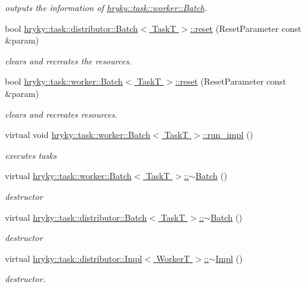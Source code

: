 \begin{DoxyCompactItemize}
\begin{DoxyCompactList}\small\item\em outputs the information of \hyperlink{classhryky_1_1task_1_1worker_1_1_batch}{hryky\-::task\-::worker\-::\-Batch}. \end{DoxyCompactList}\item 
bool \hyperlink{group__task_ga9ebf9038e6e40f583b3b26866e1f8131}{hryky\-::task\-::distributor\-::\-Batch$<$ Task\-T $>$\-::reset} (Reset\-Parameter const \&param)
\begin{DoxyCompactList}\small\item\em clears and recreates the resources. \end{DoxyCompactList}\item 
bool \hyperlink{group__task_ga88b1f6b27be23acb9fd42203d7cd3933}{hryky\-::task\-::worker\-::\-Batch$<$ Task\-T $>$\-::reset} (Reset\-Parameter const \&param)
\begin{DoxyCompactList}\small\item\em clears and recreates resources. \end{DoxyCompactList}\item 
virtual void \hyperlink{group__task_ga1f7366c2252fb0c7a7c8dc6f92a31e88}{hryky\-::task\-::worker\-::\-Batch$<$ Task\-T $>$\-::run\-\_\-impl} ()
\begin{DoxyCompactList}\small\item\em executes tasks \end{DoxyCompactList}\item 
virtual \hyperlink{group__task_ga11956032bccdfa3a83ec3615f9c03d0f}{hryky\-::task\-::worker\-::\-Batch$<$ Task\-T $>$\-::$\sim$\-Batch} ()
\begin{DoxyCompactList}\small\item\em destructor \end{DoxyCompactList}\item 
virtual \hyperlink{group__task_ga80bd5c0c04972878c21bd5eda4c7d4e7}{hryky\-::task\-::distributor\-::\-Batch$<$ Task\-T $>$\-::$\sim$\-Batch} ()
\begin{DoxyCompactList}\small\item\em destructor \end{DoxyCompactList}\item 
\hypertarget{group__task_gae688f82c064cc006f0eba491339faca1}{virtual \hyperlink{group__task_gae688f82c064cc006f0eba491339faca1}{hryky\-::task\-::distributor\-::\-Impl$<$ Worker\-T $>$\-::$\sim$\-Impl} ()}\label{group__task_gae688f82c064cc006f0eba491339faca1}

\begin{DoxyCompactList}\small\item\em destructor. \end{DoxyCompactList}\end{DoxyCompactItemize}


